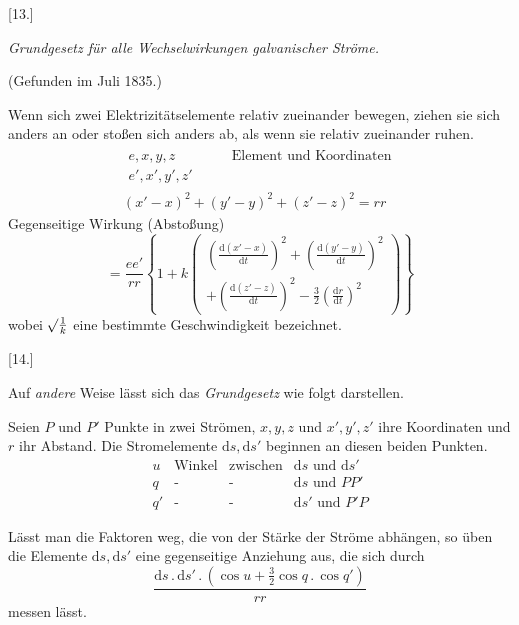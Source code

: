 \par{}
\begin{center}[13.]\par\medskip\textit{Grundgesetz für alle Wechselwirkungen galvanischer Ströme.}\par\smallskip(Gefunden im Juli 1835.)\end{center}
Wenn sich zwei Elektrizitätselemente relativ zueinander bewegen, ziehen sie sich anders an oder stoßen sich anders ab, als wenn sie relativ zueinander ruhen.
\[
\begin{gathered}
\begin{aligned}
e,x,y,z&\qquad\text{Element und Koordinaten}\\
e',x',y',z'&
\end{aligned}\\[4pt]
(x'-x)^2+(y'-y)^2+(z'-z)^2=rr
\end{gathered}
\]
Gegenseitige Wirkung (Abstoßung)
\[
=\frac{ee'}{rr}\left\{1+k\left(\begin{gathered}
\left(\frac{\mathrm d(x'-x)}{\mathrm dt}\right)^2+\left(\frac{\mathrm d(y'-y)}{\mathrm dt}\right)^2\\
+\left(\frac{\mathrm d(z'-z)}{\mathrm dt}\right)^2-\tfrac{3}{2}\left(\frac{\mathrm dr}{\mathrm dt}\right)^2
\end{gathered}\right)\right\}
\]
wobei $\mathord{{}^{}\!\surd}\frac{1}{k}$ eine bestimmte Geschwindigkeit bezeichnet.

\begin{center}[14.]\end{center}
Auf \textit{andere} Weise lässt sich das \textit{Grundgesetz} wie folgt darstellen.

Seien $P$ und $P'$ Punkte in zwei Strömen, $x,y,z$ und $x',y',z'$ ihre Koordinaten und $r$ ihr Abstand. Die Stromelemente $\mathrm ds,\mathrm ds'$ beginnen an diesen beiden Punkten.
\[
\begin{array}{rllll}
u&\text{Winkel}&\text{zwischen}&\mathrm ds\text{ und }\mathrm ds'\\
q&\text{-}&\text{-}&\mathrm ds\text{ und }PP'\\
q'&\text{-}&\text{-}&\mathrm ds'\text{ und }P'P
\end{array}
\]

Lässt man die Faktoren weg, die von der Stärke der Ströme abhängen, so üben die Elemente $\mathrm ds,\mathrm ds'$ eine gegenseitige Anziehung aus, die sich durch
\[
\frac{\mathrm ds\,.\,\mathrm ds'\,.\,(\cos u+\tfrac{3}{2}\cos q\,.\,\cos q')}{rr}
\]
messen lässt.

